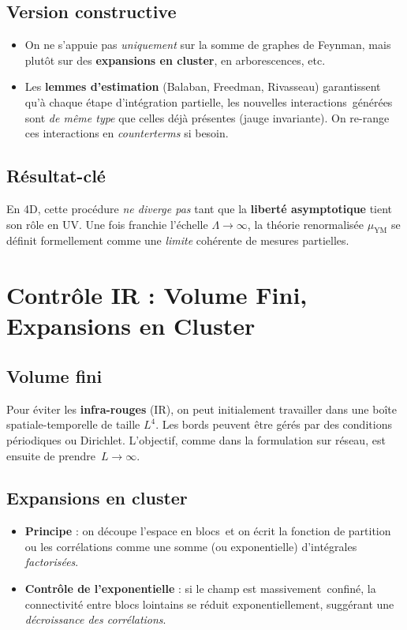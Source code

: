 \subsection*{Version constructive}
\begin{itemize}
	\item On ne s’appuie pas \textit{uniquement} sur la somme de graphes de Feynman, mais plutôt sur des \textbf{expansions en cluster}, en arborescences, etc.  
	\item Les \textbf{lemmes d’estimation} (Balaban, Freedman, Rivasseau) garantissent qu’à chaque étape d’intégration partielle, les nouvelles \og interactions\fg\ générées sont \emph{de même type} que celles déjà présentes (jauge invariante). On re-range ces interactions en \emph{counterterms} si besoin.
\end{itemize}

\subsection*{Résultat-clé}
En 4D, cette procédure \emph{ne diverge pas} tant que la \textbf{liberté asymptotique} tient son rôle en UV. Une fois franchie l’échelle \(\Lambda \to \infty\), la théorie renormalisée \(\mu_{\mathrm{YM}}\) se définit formellement comme une \emph{limite} cohérente de mesures partielles.

\vspace{1em}

\section{Contrôle IR : Volume Fini, Expansions en Cluster}
\label{sec:5.5}

\subsection*{Volume fini}
Pour éviter les \textbf{infra-rouges} (IR), on peut initialement travailler dans une boîte spatiale-temporelle de taille \(L^4\). Les bords peuvent être gérés par des conditions périodiques ou Dirichlet. L’objectif, comme dans la formulation sur réseau, est ensuite de prendre \(\,L\to\infty\).

\subsection*{Expansions en cluster}
\begin{itemize}
	\item \textbf{Principe} : on découpe l’espace en \og blocs\fg\ et on écrit la fonction de partition ou les corrélations comme une somme (ou exponentielle) d’intégrales \emph{factorisées}.  
	\item \textbf{Contrôle de l’exponentielle} : si le champ est \og massivement\fg\ confiné, la connectivité entre blocs lointains se réduit exponentiellement, suggérant une \emph{décroissance des corrélations}.
\end{itemize}

